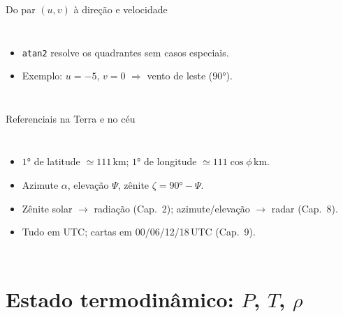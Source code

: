 \documentclass[aspectratio=169,11pt]{beamer}
\begin{document}
\begin{frame}{Do par $(u,v)$ à direção e velocidade}
  \begin{columns}
    \vspace{0.4em}
    \begin{itemize}
      \item \texttt{atan2} resolve os quadrantes sem casos especiais.
      \item Exemplo: $u=-5$, $v=0$ $\Rightarrow$ vento \alert{de leste}
            ($90°$).
    \end{itemize}
  \end{columns}
\end{frame}

\begin{frame}{Referenciais na Terra e no céu}
  \begin{columns}
    \begin{itemize}
      \item $1°$ de latitude $\simeq 111$\,km; $1°$ de longitude
            $\simeq 111\cos\phi$\,km.
      \item Azimute $\alpha$, elevação $\Psi$, zênite
            $\zeta = 90°-\Psi$.
      \item Zênite solar $\to$ radiação (Cap.~2); azimute/elevação $\to$
            radar (Cap.~8).
      \item Tudo em \alert{UTC}; cartas em 00/06/12/18\,UTC (Cap.~9).
    \end{itemize}
  \end{columns}
\end{frame}

\section{Estado termodinâmico: $P$, $T$, $\rho$}
\end{document}
